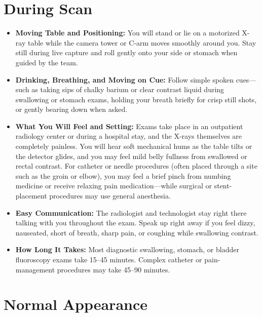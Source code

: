\section{During Scan}

\begin{itemize}
    \item \textbf{Moving Table and Positioning:} You will stand or lie on a motorized X-ray table while the camera tower or C-arm moves smoothly around you. Stay still during live capture and roll gently onto your side or stomach when guided by the team.
    \item \textbf{Drinking, Breathing, and Moving on Cue:} Follow simple spoken cues---such as taking sips of chalky barium or clear contrast liquid during swallowing or stomach exams, holding your breath briefly for crisp still shots, or gently bearing down when asked.
    \item \textbf{What You Will Feel and Setting:} Exams take place in an outpatient radiology center or during a hospital stay, and the X-rays themselves are completely painless. You will hear soft mechanical hums as the table tilts or the detector glides, and you may feel mild belly fullness from swallowed or rectal contrast. For catheter or needle procedures (often placed through a site such as the groin or elbow), you may feel a brief pinch from numbing medicine or receive relaxing pain medication---while surgical or stent-placement procedures may use general anesthesia.
    \item \textbf{Easy Communication:} The radiologist and technologist stay right there talking with you throughout the exam. Speak up right away if you feel dizzy, nauseated, short of breath, sharp pain, or coughing while swallowing contrast.
    \item \textbf{How Long It Takes:} Most diagnostic swallowing, stomach, or bladder fluoroscopy exams take 15--45 minutes. Complex catheter or pain-management procedures may take 45--90 minutes.
\end{itemize}

\section{Normal Appearance}


